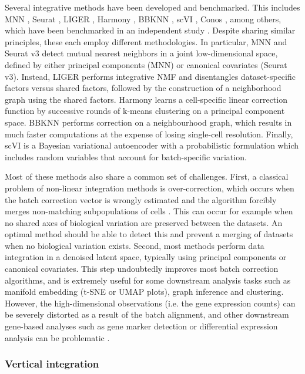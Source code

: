 Several integrative methods have been developed and benchmarked. This includes MNN \cite{Haghverdi2018}, Seurat \cite{Butler2018}, LIGER \cite{Welch2019}, Harmony \cite{Korsunsky2019}, BBKNN \cite{Polanski2019}, scVI \cite{Lopez2018}, Conos \cite{Barkas2019}, among others, which have been benchmarked in an independent study \cite{Luecken2020}. Despite sharing similar principles, these each employ different methodologies. In particular, MNN and Seurat v3 detect mutual nearest neighbors in a joint low-dimensional space, defined by either principal components (MNN) or canonical covariates (Seurat v3). Instead, LIGER performs integrative NMF and disentangles dataset-specific factors versus shared factors, followed by the construction of a neighborhood graph using the shared factors. Harmony learns a cell-specific linear correction function by successive rounds of k-means clustering on a principal component space. BBKNN performs correction on a neighbourhood graph, which results in much faster computations at the expense of losing single-cell resolution. Finally, scVI is a Bayesian variational autoencoder with a probabilistic formulation which includes random variables that account for batch-specific variation.

Most of these methods also share a common set of challenges. First, a classical problem of non-linear integration methods is over-correction, which occurs when the batch correction vector is wrongly estimated and the algorithm forcibly merges non-matching subpopulations of cells \cite{Luecken2020}. This can occur for example when no shared axes of biological variation are preserved between the datasets. An optimal method should be able to detect this and prevent a merging of datasets when no biological variation exists. Second, most methods perform data integration in a denoised latent space, typically using principal components or canonical covariates. This step undoubtedly improves most batch correction algorithms, and is extremely useful for some downstream analysis tasks such as manifold embedding (t-SNE or UMAP plots), graph inference and clustering. However, the high-dimensional observations (i.e. the gene expression counts) can be severely distorted as a result of the batch alignment, and other downstream gene-based analyses such as gene marker detection or differential expression analysis can be problematic \cite{Haghverdi2018}.

\subsubsection{Vertical integration}

